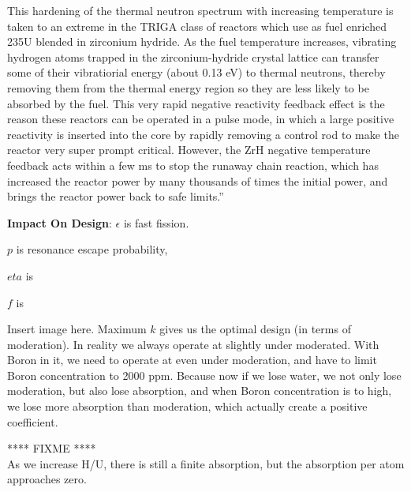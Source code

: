 \documentclass{school-22.211-notes}
\begin{document}
This hardening of the thermal neutron spectrum with increasing temperature
is taken to an extreme in the TRIGA class of reactors which use as fuel enriched 235U blended in zirconium hydride. As the fuel temperature increases, vibrating hydrogen atoms trapped in the zirconium-hydride crystal lattice can transfer some
of their vibratiorial energy (about 0.13 eV) to thermal neutrons, thereby removing
them from the thermal energy region so they are less likely to be absorbed by the
fuel. This very rapid negative reactivity feedback effect is the reason these reactors
can be operated in a pulse mode, in which a large positive reactivity is inserted into
the core by rapidly removing a control rod to make the reactor very super prompt
critical. However, the ZrH negative temperature feedback acts within a few ms to
stop the runaway chain reaction, which has increased the reactor power by many
thousands of times the initial power, and brings the reactor power back to safe
limits.'' 


\textbf{Impact On Design}: 
$\epsilon$ is fast fission. 

$p$ is resonance escape probability, 

$eta$ is 

$f$ is


Insert image here. Maximum $k$ gives us the optimal design (in terms of moderation). In reality we always operate at slightly under moderated. With Boron in it, we need to operate at even under moderation, and have to limit Boron concentration to 2000 ppm. Because now if we lose water, we not only lose moderation, but also lose absorption, and when Boron concentration is to high, we lose more absorption than moderation, which actually create a positive coefficient. 

**** FIXME **** \\
As we increase H/U, there is still a finite absorption, but the absorption per atom approaches zero. 

\clearpage
\end{document}
